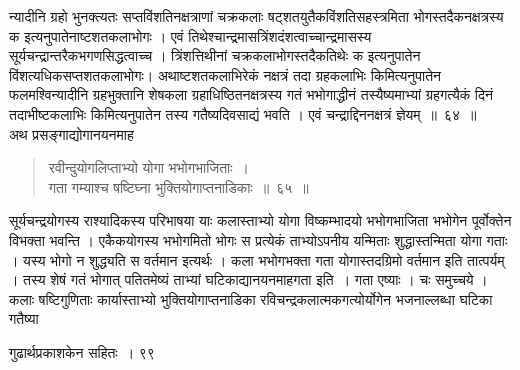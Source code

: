 \documentclass[11pt, openany]{book}
\begin{document}
\begin{sloppypar}
\noindent न्यादीनि ग्रहो भुनक्त्यतः सप्तविंशतिनक्षत्राणां चक्रकलाः षट्शतयुतैकविंशतिसहस्त्रमिता भोगस्तदैकनक्षत्रस्य क इत्यनुपातेनाष्टशतकलाभोगः । एवं तिथेश्चान्द्रमासत्रिंशदंशत्वाच्चान्द्रमासस्य सूर्यचन्द्रान्तरैकभगणसिद्धत्वाच्च । त्रिंशत्तिथीनां चक्रकलाभोगस्तदैकतिथेः क इत्यनुपातेन विंशत्यधिकसप्तशतकलाभोगः। अथाष्टशतकलाभिरेकं नक्षत्रं तदा ग्रहकलाभिः किमित्यनुपातेन फलमश्विन्यादीनि ग्रहभुक्तानि शेषकला ग्रहाधिष्ठितनक्षत्रस्य गतं भभोगाद्धीनं तस्यैष्यमाभ्यां ग्रहगत्यैकं दिनं तदाभीष्टकलाभिः किमित्यनुपातेन तस्य गतैष्यदिवसाद्यं भवति । एवं चन्द्राद्दिननक्षत्रं ज्ञेयम्~॥~६४~॥\\
\noindent अथ प्रसङ्गाद्योगानयनमाह\textendash
\end{sloppypar}
\begin{quote}

 {\ssi रवीन्दुयोगलिप्ताभ्यो योगा भभोगभाजिताः~।\\
गता गम्याश्च षष्टिघ्ना भुक्तियोगाप्तनाडिकाः~॥~६५~॥}
\end{quote}
\begin{sloppypar}
 सूर्यचन्द्रयोगस्य राश्यादिकस्य परिभाषया याः कलास्ताभ्यो योगा विष्कम्भादयो भभोगभाजिता भभोगेन पूर्वोक्तेन विभक्ता भवन्ति । एकैकयोगस्य भभोगमितो भोगः स प्रत्येकं ताभ्योऽपनीय यन्मिताः शुद्धास्तन्मिता योगा गताः । यस्य भोगो न शुद्ध्यति स वर्तमान इत्यर्थः । कला भभोगभक्ता गता योगास्तदग्रिमो वर्तमान इति तात्पर्यम् । तस्य शेषं गतं भोगात् पतितमेष्यं ताभ्यां घटिकाद्यानयनमाह\textendash गता इति~। गता एष्याः । चः समुच्चये । कलाः षष्टिगुणिताः कार्यास्ताभ्यो भुक्तियोगाप्तनाडिका रविचन्द्रकलात्मकगत्योर्योगेन भजनाल्लब्धा घटिका गतैष्या
\end{sloppypar}

\newpage


\hspace{3cm}  गुढार्थप्रकाशकेन सहितः~। \hfill ९९
\vspace{1cm}
\end{document}
